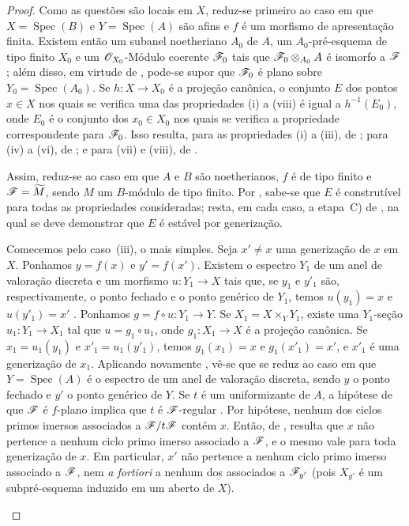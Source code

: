\begin{proof}
Como as questões são locais em $X$, reduz-se primeiro ao caso em que
$X=\operatorname{Spec}(B)$ e $Y=\operatorname{Spec}(A)$ são afins e
$f$ é um morfismo de apresentação finita. Existem então um
subanel noetheriano $A_0$ de $A$, um $A_0$-pré-esquema de tipo
finito $X_0$ e um $\mathscr{O}_{X_0}$-Módulo coerente $\mathscr{F}_0$ tais
que $\mathscr{F}_0\otimes_{A_0}A$ é isomorfo a $\mathscr{F}$
; além disso, em virtude de ,
pode-se supor que $\mathscr{F}_0$ é plano sobre
$Y_0=\operatorname{Spec}(A_0)$. Se $h:X\to X_0$ é a projeção
canônica, o conjunto $E$ dos pontos $x\in X$ nos quais se verifica
uma das propriedades (i) a (viii) é igual a $h^{-1}(E_0)$, onde
$E_0$ é o conjunto dos $x_0\in X_0$ nos quais se verifica a
propriedade correspondente para $\mathscr{F}_0$. Isso resulta, para
as propriedades (i) a (iii), de ; para (iv) a
(vi), de ; e para (vii) e (viii), de
.

Assim, reduz-se ao caso em que $A$ e $B$ são noetherianos, $f$ é
de tipo finito e $\mathscr{F}=\widetilde M$, sendo $M$ um $B$-módulo
de tipo finito. Por , sabe-se que $E$ é construtível
para todas as propriedades consideradas; resta, em cada caso, a
etapa~C) de , na qual se deve demonstrar que $E$
é estável por generização.

\begin{env}[12.1.1.1]
\label{IV.12.1.1.1}
Comecemos pelo caso~(iii), o mais simples. Seja $x'\ne x$ uma
generização de $x$ em $X$. Ponhamos $y=f(x)$ e $y'=f(x')$.
Existem o espectro $Y_1$ de um anel de valoração discreta e um
morfismo $u:Y_1\to X$ tais que, se $y_1$ e $y'_1$ são,
respectivamente, o ponto fechado e o ponto genérico de $Y_1$,
temos $u(y_1)=x$ e $u(y'_1)=x'$ .
Ponhamos $g=f\circ u:Y_1\to Y$. Se
$X_1=X\times_Y Y_1$, existe uma $Y_1$-seção
$u_1:Y_1\to X_1$ tal que $u=g_1\circ u_1$, onde
$g_1:X_1\to X$ é a projeção canônica. Se
$x_1=u_1(y_1)$ e $x'_1=u_1(y'_1)$, temos
$g_1(x_1)=x$ e $g_1(x'_1)=x'$, e $x'_1$ é uma
generização de $x_1$. Aplicando novamente
, vê-se
que se reduz ao caso em que $Y=\operatorname{Spec}(A)$ é o
espectro de um anel de valoração discreta, sendo $y$ o ponto
fechado e $y'$ o ponto genérico de $Y$. Se $t$ é um
uniformizante de $A$, a hipótese de que $\mathscr{F}$ é $f$-plano
implica que $t$ é $\mathscr{F}$-regular .
Por hipótese, nenhum dos ciclos primos imersos associados a
$\mathscr{F}/t\mathscr{F}$ contém $x$. Então, de
, resulta que $x$ não pertence a nenhum ciclo
primo imerso associado a $\mathscr{F}$, e o mesmo vale para toda
generização de $x$. Em particular, $x'$ não pertence a nenhum
ciclo primo imerso associado a $\mathscr{F}$, nem
\emph{a fortiori} a nenhum dos associados a $\mathscr{F}_{y'}$
(pois $X_{y'}$ é um subpré-esquema induzido em um aberto de $X$).
\end{env}


\end{proof}
